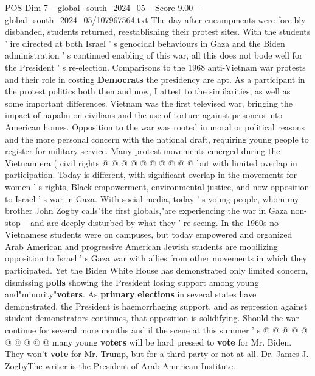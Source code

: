 \begin{textsample}{POS Dim 7 – global\_south\_2024\_05 – Score 9.00 – global\_south\_2024\_05/107967564.txt}
The day after encampments were forcibly disbanded, students returned, reestablishing their protest sites.
With the students ' ire directed at both Israel ' s genocidal behaviours in Gaza and the Biden administration ' s continued enabling of this war, all this does not bode well for the President ' s re-election.
Comparisons to the 1968 anti-Vietnam war protests and their role in costing \textbf{Democrats} the presidency are apt.
As a participant in the protest politics both then and now, I attest to the similarities, as well as some important differences.
Vietnam was the first televised war, bringing the impact of napalm on civilians and the use of torture against prisoners into American homes.
Opposition to the war was rooted in moral or political reasons and the more personal concern with the national draft, requiring young people to register for military service.
Many protest movements emerged during the Vietnam era ( civil rights @ @ @ @ @ @ @ @ @ @ but with limited overlap in participation.
Today is different, with significant overlap in the movements for women ' s rights, Black empowerment, environmental justice, and now opposition to Israel ' s war in Gaza.
With social media, today ' s young people, whom my brother John Zogby calls"the first globals,"are experiencing the war in Gaza non-stop -- and are deeply disturbed by what they ' re seeing.
In the 1960s no Vietnamese students were on campuses, but today empowered and organized Arab American and progressive American Jewish students are mobilizing opposition to Israel ' s Gaza war with allies from other movements in which they participated.
Yet the Biden White House has demonstrated only limited concern, dismissing \textbf{polls} showing the President losing support among young and"minority"\textbf{voters}.
As \textbf{primary} \textbf{elections} in several states have demonstrated, the President is haemorrhaging support, and as repression against student demonstrators continues, that opposition is solidifying.
Should the war continue for several more months and if the scene at this summer ' s @ @ @ @ @ @ @ @ @ @ many young \textbf{voters} will be hard pressed to \textbf{vote} for Mr.
Biden.
They won't \textbf{vote} for Mr.
Trump, but for a third party or not at all.
Dr.
James J.
ZogbyThe writer is the President of Arab American Institute.

\end{textsample}
